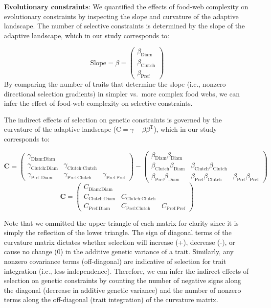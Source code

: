 \documentclass[11pt,]{article}
\begin{document}
\textbf{Evolutionary constraints}: We quantified the effects of food-web
complexity on evolutionary constraints by inspecting the slope and
curvature of the adaptive landscape. The number of selective constraints
is determined by the slope of the adaptive landscape, which in our study
corresponds to:

\[\text{Slope} = \beta = \begin{pmatrix} \beta_{\text{Diam}} \\ \beta_{\text{Clutch}} \\ \beta_{\text{Pref}} \end{pmatrix} \]
By comparing the number of traits that determine the slope (i.e.,
nonzero directional selection gradients) in simpler vs.~more complex
food webs, we can infer the effect of food-web complexity on selective
constraints.

The indirect effects of selection on genetic constraints is governed by
the curvature of the adaptive landscape
(\(\text{C}=\gamma - \beta \beta^\text{T}\)), which in our study
corresponds to:

\[\textbf{C} = \begin{pmatrix} \gamma_{\text{Diam:Diam}}&& \\ \gamma_{\text{Clutch:Diam}}&\gamma_{\text{Clutch:Clutch}}& \\ \gamma_{\text{Pref:Diam}} & \gamma_{\text{Pref:Clutch}} &\gamma_{\text{Pref:Pref}} \end{pmatrix} - \begin{pmatrix} \beta_{\text{Diam}}\beta_{\text{Diam}}&& \\ \beta_{\text{Clutch}}\beta_{\text{Diam}}&\beta_{\text{Clutch}}\beta_{\text{Clutch}}& \\ \beta_{\text{Pref}}\beta_{\text{Diam}} & \beta_{\text{Pref}}\beta_{\text{Clutch}} &\beta_{\text{Pref}}\beta_{\text{Pref}} \end{pmatrix}\]
\[\textbf{C} = \begin{pmatrix} C_{\text{Diam:Diam}}&& \\ C_{\text{Clutch:Diam}} & C_{\text{Clutch:Clutch}} & \\ C_{\text{Pref:Diam}} & C_{\text{Pref:Clutch}} & C_{\text{Pref:Pref}} \end{pmatrix}\]

Note that we ommitted the upper triangle of each matrix for clarity
since it is simply the reflection of the lower triangle. The sign of
diagonal terms of the curvature matrix dictates whether selection will
increase (+), decrease (-), or cause no change (0) in the additive
genetic variance of a trait. Similarly, any nonzero covariance terms
(off-diagonal) are indicative of selection for trait integration (i.e.,
less independence). Therefore, we can infer the indirect effects of
selection on genetic constraints by counting the number of negative
signs along the diagonal (decrease in additive genetic variance) and the
number of nonzero terms along the off-diagonal (trait integration) of
the curvature matrix.
\end{document}

